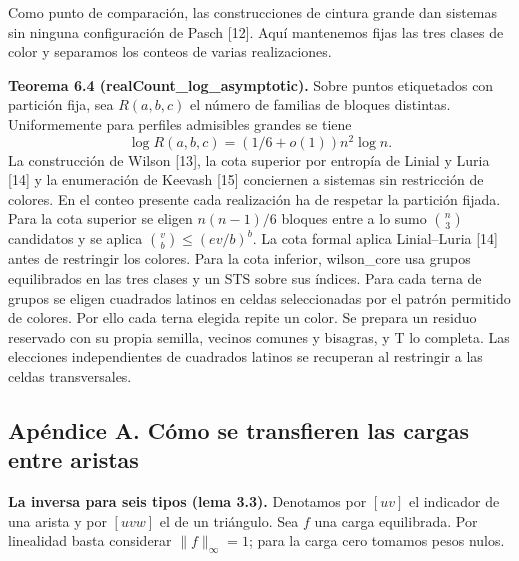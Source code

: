 \documentclass[spanish,11pt,a4paper]{article}
\begin{document}
Como punto de comparación, las construcciones de cintura grande dan sistemas sin ninguna configuración de Pasch {[}12{]}. Aquí mantenemos fijas las tres clases de color y separamos los conteos de varias realizaciones.

\textbf{Teorema 6.4 (realCount\_log\_asymptotic).} Sobre puntos etiquetados con partición fija, sea \(R(a,b,c)\) el número de familias de bloques distintas. Uniformemente para perfiles admisibles grandes se tiene \[\log R(a,b,c)=(1/6+o(1))n^2\log n.\] La construcción de Wilson {[}13{]}, la cota superior por entropía de Linial y Luria {[}14{]} y la enumeración de Keevash {[}15{]} conciernen a sistemas sin restricción de colores. En el conteo presente cada realización ha de respetar la partición fijada. Para la cota superior se eligen \(n(n-1)/6\) bloques entre a lo sumo \(\binom n3\) candidatos y se aplica \(\binom{v}{b}\le(ev/b)^b\). La cota formal aplica Linial--Luria {[}14{]} antes de restringir los colores. Para la cota inferior, wilson\_core usa grupos equilibrados en las tres clases y un STS sobre sus índices. Para cada terna de grupos se eligen cuadrados latinos en celdas seleccionadas por el patrón permitido de colores. Por ello cada terna elegida repite un color. Se prepara un residuo reservado con su propia semilla, vecinos comunes y bisagras, y T lo completa. Las elecciones independientes de cuadrados latinos se recuperan al restringir a las celdas transversales.

\subsection{Apéndice A. Cómo se transfieren las cargas entre aristas}\label{apuxe9ndice-a.-cuxf3mo-se-transfieren-las-cargas-entre-aristas}

\textbf{La inversa para seis tipos (lema 3.3).} Denotamos por \([uv]\) el indicador de una arista y por \([uvw]\) el de un triángulo. Sea \(f\) una carga equilibrada. Por linealidad basta considerar \(\|f\|_\infty=1\); para la carga cero tomamos pesos nulos.
\end{document}

